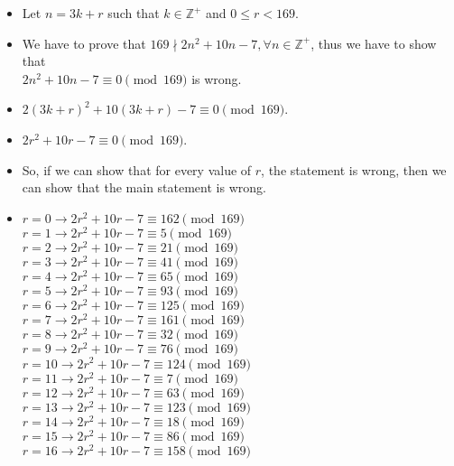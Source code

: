 \documentclass[12pt]{article}
\begin{document}
\begin{itemize}
    \item Let $n = 3k + r$ such that $k \in \mathbb{Z}^{+}$ and $0 \leq r < 169$.
    \item We have to prove that $169 \nmid 2n^2 + 10n - 7, \forall n \in \mathbb{Z}^+$, thus we have to show that \\
    $2n^2 + 10n - 7 \equiv 0 \pmod{169}$ is wrong.
    \item $2(3k + r)^2 + 10(3k + r) - 7 \equiv 0 \pmod{169}$.
    \item $2r^2 + 10r - 7 \equiv 0 \pmod{169}$.
    \item So, if we can show that for every value of $r$, the statement is wrong, then we can show that the main statement is wrong.
    \item 
        \begin{multicols}{2}
$r = 0 \rightarrow 2r^2 + 10r - 7 \equiv 162 \pmod{169}$ \\
$r = 1 \rightarrow 2r^2 + 10r - 7 \equiv 5 \pmod{169}$ \\
$r = 2 \rightarrow 2r^2 + 10r - 7 \equiv 21 \pmod{169}$ \\
$r = 3 \rightarrow 2r^2 + 10r - 7 \equiv 41 \pmod{169}$ \\
$r = 4 \rightarrow 2r^2 + 10r - 7 \equiv 65 \pmod{169}$ \\
$r = 5 \rightarrow 2r^2 + 10r - 7 \equiv 93 \pmod{169}$ \\
$r = 6 \rightarrow 2r^2 + 10r - 7 \equiv 125 \pmod{169}$ \\
$r = 7 \rightarrow 2r^2 + 10r - 7 \equiv 161 \pmod{169}$ \\
$r = 8 \rightarrow 2r^2 + 10r - 7 \equiv 32 \pmod{169}$ \\
$r = 9 \rightarrow 2r^2 + 10r - 7 \equiv 76 \pmod{169}$ \\
$r = 10 \rightarrow 2r^2 + 10r - 7 \equiv 124 \pmod{169}$ \\
$r = 11 \rightarrow 2r^2 + 10r - 7 \equiv 7 \pmod{169}$ \\
$r = 12 \rightarrow 2r^2 + 10r - 7 \equiv 63 \pmod{169}$ \\
$r = 13 \rightarrow 2r^2 + 10r - 7 \equiv 123 \pmod{169}$ \\
$r = 14 \rightarrow 2r^2 + 10r - 7 \equiv 18 \pmod{169}$ \\
$r = 15 \rightarrow 2r^2 + 10r - 7 \equiv 86 \pmod{169}$ \\
$r = 16 \rightarrow 2r^2 + 10r - 7 \equiv 158 \pmod{169}$ \\

\end{multicols}
\end{itemize}
\end{document}
